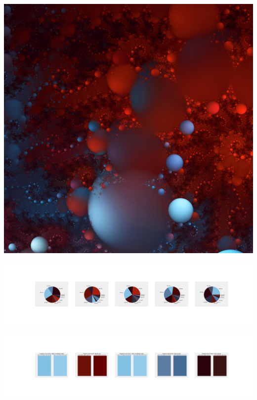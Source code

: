 \documentclass[11pt]{article}
\begin{document}
\begin{landscape}
    \begin{center}
    \includegraphics[width=\textwidth]{./nbimg/file (296).jpg}
    \end{center}

    \begin{center}
    \includegraphics[width=250mm]{./nbimg/pie-218.jpg}
    \end{center}

    \begin{center}
    \includegraphics[width=250mm]{./nbimg/peak-218.jpg}
    \end{center}
    


\end{landscape}
\end{document}
